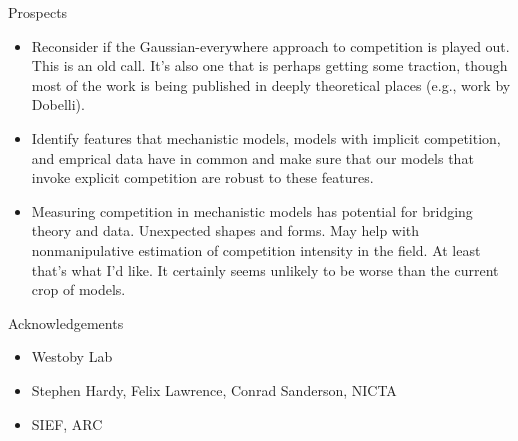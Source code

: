 \documentclass[12pt]{beamer}
\begin{document}
\begin{frame}{Prospects}
  \begin{itemize}
  \item Reconsider if the Gaussian-everywhere approach to competition
    is played out.  This is an old call.  It's also one that is
    perhaps getting some traction, though most of the work is being
    published in deeply theoretical places (e.g., work by Dobelli).
  \item Identify features that mechanistic models, models with
    implicit competition, and emprical data have in common and make
    sure that our models that invoke explicit competition are robust
    to these features.
  \item Measuring competition in mechanistic models has potential for
    bridging theory and data.  Unexpected shapes and forms.  May help
    with nonmanipulative estimation of competition intensity in the
    field.  At least that's what I'd like.  It certainly seems
    unlikely to be worse than the current crop of models.
  \end{itemize}
\end{frame}

%

\begin{frame}{Acknowledgements}
  \begin{itemize}
  \item Westoby Lab
  \item Stephen Hardy, Felix Lawrence, Conrad Sanderson, NICTA
  \item SIEF, ARC
  \end{itemize}
\end{frame}


    
\end{document}
